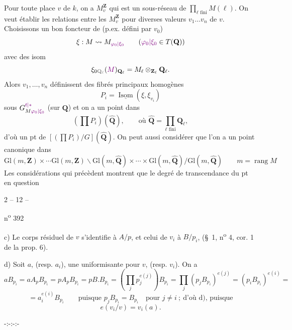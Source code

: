 Pour toute place $v$ de $k$, on a $M_v^{\mathbf Z}$ qui est un sous-réseau de $\prod_{\ell\text{ fini}}M(\ell)$. On veut établir les relations entre les $M_v^{\mathbf Z}$ pour diverses valeurs $v_1\ldots v_n$ de $v$. Choisissons un bon foncteur de  (p.ex. défini par $v_0$)
\[
 \xi:M\rightsquigarrow M_{\unsure{\varphi_0|\xi_0}}\qquad(\unsure{\varphi_0|\xi_0}\in T(\mathbf Q))
\]
avec des isom 
\[
 \xi_{0\deleted{\mathbf Q_\ell}}(\unsure{M})_{\mathbf Q_\ell}=M_\ell\otimes_{\mathbf Z_\ell}\mathbf Q_\ell.
\]
Alors $v_1,\ldots,v_n$ définissent des fibrés principaux homogènes
\[
 P_i=\underline{\operatorname{Isom}}(\xi,\xi_{v_i})
\]
sous $G^{\unsure{t|*}}_{M\unsure{\varphi_0|\xi_0}}$ (sur $\mathbf Q$) et on a un point dans
\[
 (\prod P_i)(\widehat{\mathbf Q}),\qquad\text{où }\widehat{\mathbf Q}=\prod_{\ell\text{ fini}}\mathbf Q_\ell,
\]
d'où un pt de $[(\prod P_i)/G](\widehat{\mathbf Q})$.
On peut aussi considérer que l'on a un point canonique dans
\[
 \mathrm{Gl}(m,\mathbf Z)\times\cdots\mathrm{Gl}(m,\mathbf Z)\backslash
 \mathrm{Gl}(m,\widehat{\mathbf Q})\times\cdots\times\mathrm{Gl}(m,\widehat{\mathbf Q})/\mathrm{Gl}(m,\widehat{\mathbf Q})
 \qquad m=\operatorname{rang}M
\]
Les considérations qui précèdent montrent que le degré de transcendance du pt en question

\begin{center}2 -- 12 --\end{center}
\begin{flushright}n\textsuperscript{o} 392\end{flushright}

c) Le corps résiduel de $v$ s'identifie à $A/p$, et celui de $v_i$ à $B/p_i$, (\S\ 1, n\textsuperscript{o} 4, cor. 1 de la prop. 6).

d) Soit $a$, (resp. $a_i$), une uniformisante pour $v$, (resp. $v_i$). On a
\[
 aB_{p_i}=aA_pB_{p_i}=pA_pB_{p_i}=pB.B_{p_i}
 =(\prod_j p_j^{e(j)})B_{p_i}
 =\prod_j(p_jB_{p_i})^{e(j)}=(p_iB_{p_i})^{e(i)}=
\]
\[
 =a_i^{e(i)}B_{p_i}\qquad\text{puisque }p_jB_{p_i}=B_{p_i}\quad\text{pour }j\ne i\ ;\ \text{d'où d), puisque}
\]
\[
 e(v_i/v)=v_i(a).
\]
\begin{center}-:-:-:-\end{center}

